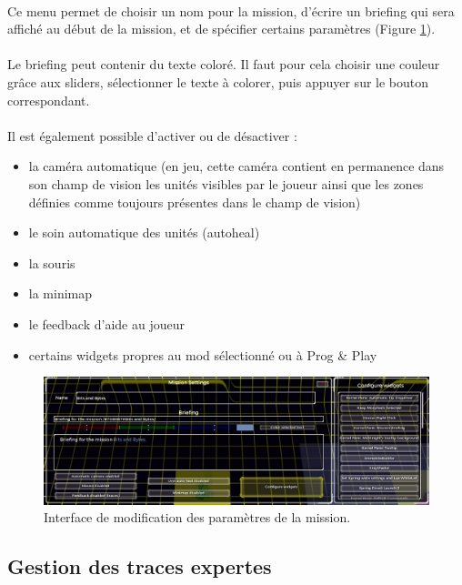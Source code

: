 \documentclass[a4paper]{article}
\begin{document}
\paragraph{ }
Ce menu permet de choisir un nom pour la mission, d'écrire un briefing qui sera affiché au début de la mission, et de spécifier certains paramètres (Figure \ref{fig:editor-mapsettings}).
\paragraph{ }
Le briefing peut contenir du texte coloré. Il faut pour cela choisir une couleur grâce aux sliders, sélectionner le texte à colorer, puis appuyer sur le bouton correspondant.
\paragraph{ }
Il est également possible d'activer ou de désactiver :
\begin{itemize}
\item la caméra automatique (en jeu, cette caméra contient en permanence dans son champ de vision les unités visibles par le joueur ainsi que les zones définies comme toujours présentes dans le champ de vision)
\item le soin automatique des unités (autoheal)
\item la souris
\item la minimap
\item le feedback d'aide au joueur
\item certains widgets propres au mod sélectionné ou à Prog \& Play
\end{itemize}
\begin{figure}[H]
\centering
\includegraphics[width=\linewidth]{editor-mapsettings.png}
\caption{Interface de modification des paramètres de la mission.}
\label{fig:editor-mapsettings}
\end{figure}
\subsection{Gestion des traces expertes}
\end{document}
